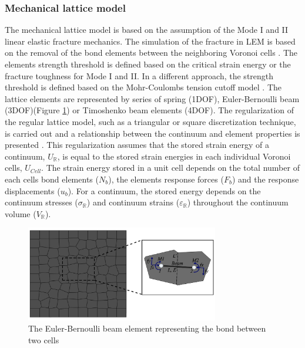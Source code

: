 \subsubsection*{Mechanical lattice model}

The mechanical lattice model is based on the assumption of the Mode I and II linear elastic fracture mechanics. The simulation of the fracture in LEM is based on the removal of the bond elements between the neighboring Voronoi cells \cite{Rizvietal2019a}. The elements strength threshold is defined based on the critical strain energy or the fracture toughness for Mode I and II. In a different approach, the strength threshold is defined based on the Mohr-Coulombs tension cutoff model \cite{Bolanderetal1998}. The lattice elements are represented by series of spring (1DOF),  Euler-Bernoulli beam (3DOF)(Figure \ref{fig:Amir_LEM_Beam}) or Timoshenko beam elements (4DOF). The regularization of the regular lattice model, such as a triangular or square discretization technique, is carried out and a relationship between the continuum and element properties is presented \cite{Ostojastarzewski2002, Karihalooetal2003}. This regularization assumes that the stored strain energy of a continuum, $U_{\mathbb{R}}$, is equal to the stored strain energies in each individual Voronoi cells, $U_{Cell}$. The strain energy stored in a unit cell depends on the total number of each cells bond elements ($N_b$), the elements response forces ($F_b$) and the response displacements ($u_b$). For a continuum, the stored energy depends on the continuum stresses ($\sigma_{\mathbb{R}}$) and continuum strains ($\varepsilon_{\mathbb{R}}$) throughout the continuum volume ($V_{\mathbb{R}}$).

\begin{figure}[!ht]
\centering
\includegraphics[width=0.75\textwidth]{figures/Amir_LEM_Beam.png}
\caption{The Euler-Bernoulli beam element representing the bond between two cells}
\label{fig:Amir_LEM_Beam}
\end{figure}

